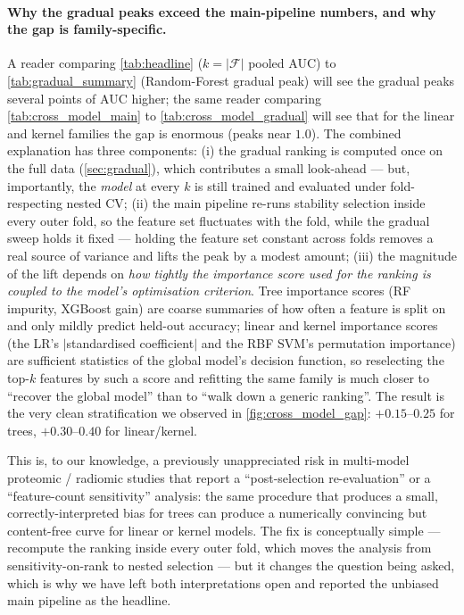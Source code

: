 \documentclass[11pt,a4paper]{article}
\providecommand{\Cref}[1]{\autoref{#1}}
\begin{document}
\paragraph{Why the gradual peaks exceed the main-pipeline numbers, and
why the gap is family-specific.}
A reader comparing \Cref{tab:headline} ($k=|\mathcal{F}|$ pooled AUC) to
\Cref{tab:gradual_summary} (Random-Forest gradual peak) will see the
gradual peaks several points of AUC higher; the same reader comparing
\Cref{tab:cross_model_main} to \Cref{tab:cross_model_gradual} will see
that for the linear and kernel families the gap is enormous (peaks near
$1.0$). The combined explanation has three components: (i) the gradual
ranking is computed once on the full data (\Cref{sec:gradual}), which
contributes a small look-ahead --- but, importantly, the \emph{model} at
every $k$ is still trained and evaluated under fold-respecting nested
CV; (ii) the main pipeline re-runs stability selection inside every
outer fold, so the feature set fluctuates with the fold, while the
gradual sweep holds it fixed --- holding the feature set constant
across folds removes a real source of variance and lifts the peak by a
modest amount; (iii) the magnitude of the lift depends on \emph{how
tightly the importance score used for the ranking is coupled to the
model's optimisation criterion}. Tree importance scores (RF impurity,
XGBoost gain) are coarse summaries of how often a feature is split on
and only mildly predict held-out accuracy; linear and kernel importance
scores (the LR's $|$standardised coefficient$|$ and the RBF SVM's
permutation importance) are sufficient statistics of the global model's
decision function, so reselecting the top-$k$ features by such a score
and refitting the same family is much closer to ``recover the global
model'' than to ``walk down a generic ranking''. The result is the very
clean stratification we observed in
\Cref{fig:cross_model_gap}: $+0.15$--$0.25$ for trees,
$+0.30$--$0.40$ for linear/kernel.

This is, to our knowledge, a previously unappreciated risk in
multi-model proteomic / radiomic studies that report a
``post-selection re-evaluation'' or a ``feature-count sensitivity''
analysis: the same procedure that produces a small,
correctly-interpreted bias for trees can produce a numerically
convincing but content-free curve for linear or kernel models. The fix
is conceptually simple --- recompute the ranking inside every outer
fold, which moves the analysis from sensitivity-on-rank to nested
selection --- but it changes the question being asked, which is why we
have left both interpretations open and reported the unbiased main
pipeline as the headline.
\end{document}
